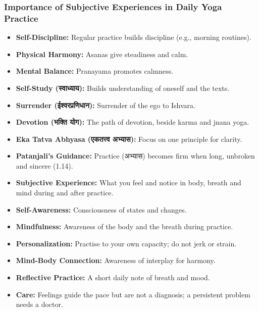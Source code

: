 \begin{frame}[fragile]\frametitle{Importance of Subjective Experiences in Daily Yoga Practice}

    \begin{itemize}
        \item \textbf{Self-Discipline:} Regular practice builds discipline (e.g., morning routines).
        \item \textbf{Physical Harmony:} Asanas give steadiness and calm.
        \item \textbf{Mental Balance:} Pranayama promotes calmness.
        \item \textbf{Self-Study (स्वाध्याय):} Builds understanding of oneself and the texts.
        \item \textbf{Surrender (ईश्वरप्रणिधान):} Surrender of the ego to Ishvara.
        \item \textbf{Devotion (भक्ति योग):} The path of devotion, beside karma and jnana yoga.
        \item \textbf{Eka Tatva Abhyasa (एकतत्त्व अभ्यास):} Focus on one principle for clarity.
        \item \textbf{Patanjali's Guidance:} Practice (अभ्यास) becomes firm when long, unbroken and sincere (1.14).
        \item \textbf{Subjective Experience:} What you feel and notice in body, breath and mind during and after practice.
        \item \textbf{Self-Awareness:} Consciousness of states and changes.
        \item \textbf{Mindfulness:} Awareness of the body and the breath during practice.
        \item \textbf{Personalization:} Practise to your own capacity; do not jerk or strain.
        \item \textbf{Mind-Body Connection:} Awareness of interplay for harmony.
        \item \textbf{Reflective Practice:} A short daily note of breath and mood.
        \item \textbf{Care:} Feelings guide the pace but are not a diagnosis; a persistent problem needs a doctor.
    \end{itemize}

\end{frame}
